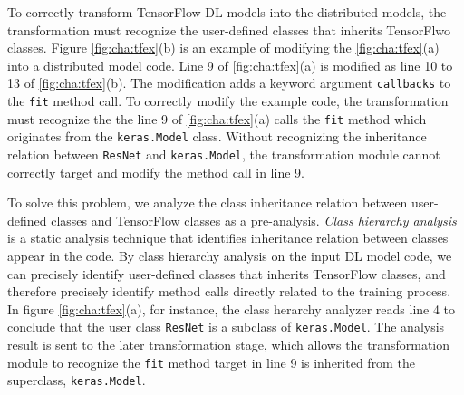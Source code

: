 To correctly transform TensorFlow DL models into the distributed models,
the transformation must recognize the user-defined classes that inherits
TensorFlwo classes.
Figure \ref{fig:cha:tfex}(b) is an example of modifying the \ref{fig:cha:tfex}(a)
into a distributed model code.
Line 9 of \ref{fig:cha:tfex}(a) is modified as line 10 to 13 of 
\ref{fig:cha:tfex}(b). The modification adds a keyword argument {\tt callbacks}
to the {\tt fit} method call. 
To correctly modify the example code, the transformation must recognize the 
the line 9 of \ref{fig:cha:tfex}(a) calls the {\tt fit} method which originates
from the {\tt keras.Model} class.
Without recognizing the inheritance relation between {\tt ResNet} and
{\tt keras.Model}, the transformation module cannot correctly target and modify the
method call in line 9.  

To solve this problem, we analyze the class inheritance relation between
user-defined classes and TensorFlow classes as a pre-analysis.
\textit{Class hierarchy analysis} is a static analysis technique that identifies
inheritance relation between classes appear in the code.
By class hierarchy analysis on the input DL model code,
we can precisely identify user-defined classes that inherits TensorFlow classes,
and therefore precisely identify method calls directly related to the training process.
In figure \ref{fig:cha:tfex}(a), for instance, 
the class herarchy analyzer reads line 4 to conclude that the user class
{\tt ResNet} is a subclass of {\tt keras.Model}.
The analysis result is sent to the later transformation stage,
which allows the transformation module to recognize the {\tt fit} method
target in line 9 is inherited from the superclass, {\tt keras.Model}.
